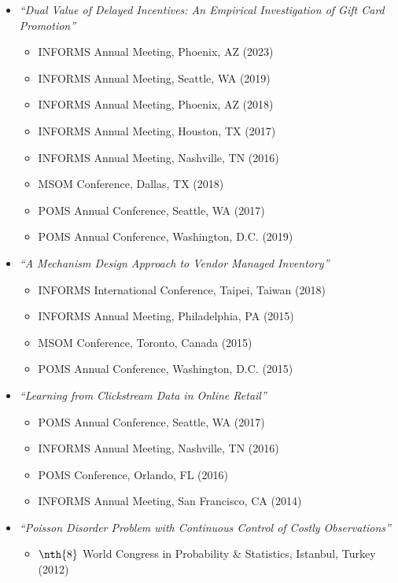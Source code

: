 \documentclass[11pt]{article}
\begin{document}
\begin{itemize}
				\item \emph{``Dual Value of Delayed Incentives: An Empirical Investigation of Gift Card Promotion''}
				\begin{itemize}[label={$\circ\;$}]
					\item  INFORMS Annual Meeting, Phoenix, AZ (2023)
					\item  INFORMS Annual Meeting, Seattle, WA (2019)
					\item  INFORMS Annual Meeting, Phoenix, AZ (2018)
					\item  INFORMS Annual Meeting, Houston, TX (2017)
					\item  INFORMS Annual Meeting, Nashville, TN (2016)
					\item  MSOM Conference, Dallas, TX (2018)
					\item  POMS Annual Conference, Seattle, WA (2017)
					\item  POMS Annual Conference, Washington, D.C. (2019)
				\end{itemize}

				\item \emph{``A Mechanism Design Approach to Vendor Managed Inventory''}
				\begin{itemize}[label={$\circ\;$}]
					\item  INFORMS International Conference,  Taipei, Taiwan (2018)
					\item  INFORMS Annual Meeting, Philadelphia, PA (2015)
					\item  MSOM Conference, Toronto, Canada (2015)
					\item  POMS Annual Conference, Washington, D.C. (2015)
				\end{itemize}



				\item \emph{``Learning from Clickstream Data in Online Retail''}
				\begin{itemize}[label={$\circ\;$}]
						\item  POMS Annual Conference, Seattle, WA (2017)
						\item  INFORMS Annual Meeting, Nashville, TN (2016)
						\item  POMS Conference, Orlando, FL (2016)
						\item  INFORMS Annual Meeting, San Francisco, CA (2014)
				\end{itemize}


				\item \emph{``Poisson Disorder Problem with Continuous Control of Costly Observations''}
				\begin{itemize}[label={$\circ\;$}]
					\item  $\nth{8}$ World Congress in Probability \& Statistics, Istanbul, Turkey (2012)
				\end{itemize}

			\end{itemize}
\end{document}
